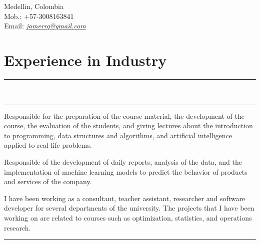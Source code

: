 \documentclass[]{rahulworld-resume}
\begin{document}
\hfill
\begin{minipage}[t]{0.66\textwidth}
\hspace*{0pt}\hfill    \\
\hspace*{0pt}\hfill    \\
\hspace*{0pt}\hfill Medellin, Colombia\\
\hspace*{0pt}\hfill Mob.: +57-3008163841 \\
\hspace*{0pt}\hfill Email: \textit{\href{mailto:janerrq@gmail.com}{jamerrq@gmail.com}}
\section{Experience in Industry}
\noindent\rule{12.5cm}{0.4pt}
\\
\noindent\rule{12.5cm}{0.4pt}

\noindent
\hspace{5em}%
\begin{minipage}{0.85\textwidth\vspace{2pt}}
Responsible for the preparation of the course material,
the development of the course, the evaluation of the students,
and giving lectures about the introduction to programming,
data structures and algorithms, and artificial intelligence applied
to real life problems.

\end{minipage}

\noindent
\hspace{5em}%
\begin{minipage}{0.85\textwidth\vspace{2pt}}
Responsible of the development of daily reports, analysis of the data,
and the implementation of machine learning models to predict the
behavior of products and services of the company.
\end{minipage}
\sectionsep


\noindent
\hspace{5em}%
\begin{minipage}{0.85\textwidth\vspace{2pt}}
I have been working as a consultant, teacher assistant, researcher
and software developer for several departments of the university.
The projects that I have been working on are related to courses such as optimization, statistics, and operations research.
\end{minipage}
\noindent\rule{12.5cm}{0.4pt}
\sectionsep


\end{minipage}
\end{document}
